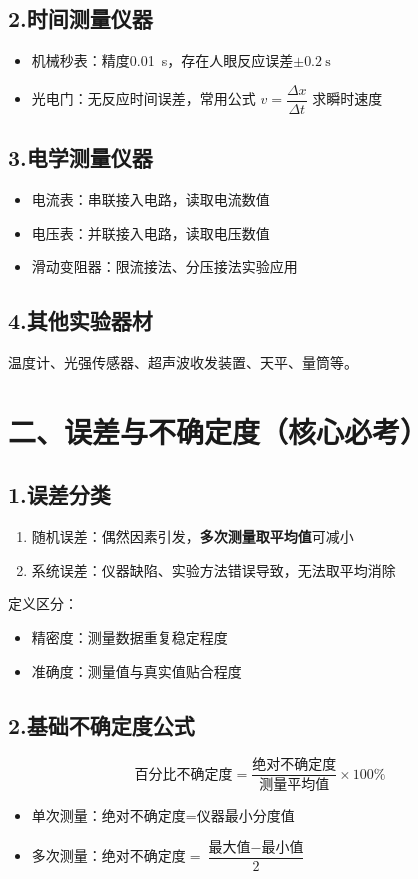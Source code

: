 \documentclass[a4paper,11pt]{article}
\begin{document}
\subsection{2.时间测量仪器}
\begin{itemize}
    \item 机械秒表：精度\SI{0.01}{\second}，存在人眼反应误差$\pm\SI{0.2}{\second}$
    \item 光电门：无反应时间误差，常用公式 $v=\dfrac{\Delta x}{\Delta t}$ 求瞬时速度
\end{itemize}

\subsection{3.电学测量仪器}
\begin{itemize}
    \item 电流表：串联接入电路，读取电流数值
    \item 电压表：并联接入电路，读取电压数值
    \item 滑动变阻器：限流接法、分压接法实验应用
\end{itemize}

\subsection{4.其他实验器材}
温度计、光强传感器、超声波收发装置、天平、量筒等。

\section{二、误差与不确定度（核心必考）}
\subsection{1.误差分类}
\begin{enumerate}[label=\arabic*.]
    \item 随机误差：偶然因素引发，\textbf{多次测量取平均值}可减小
    \item 系统误差：仪器缺陷、实验方法错误导致，无法取平均消除
\end{enumerate}
定义区分：
\begin{itemize}
    \item 精密度：测量数据重复稳定程度
    \item 准确度：测量值与真实值贴合程度
\end{itemize}

\subsection{2.基础不确定度公式}
\[
\text{百分比不确定度}
=\frac{\text{绝对不确定度}}{\text{测量平均值}}\times 100\%
\]
\begin{itemize}
    \item 单次测量：绝对不确定度=仪器最小分度值
    \item 多次测量：绝对不确定度$=\dfrac{\text{最大值}-\text{最小值}}{2}$
\end{itemize}
\end{document}
